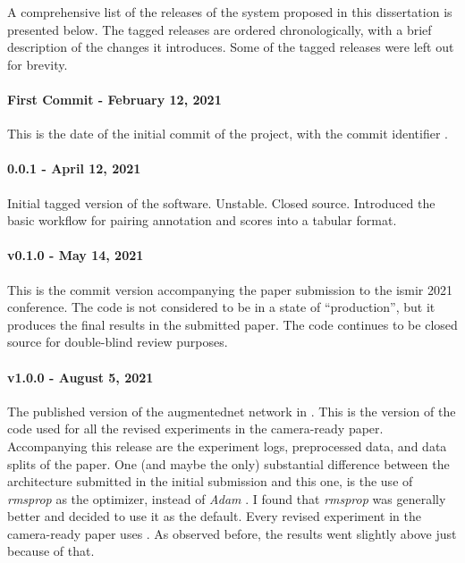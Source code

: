 
A comprehensive list of the releases of the system proposed
in this dissertation is presented below. The tagged releases
are ordered chronologically, with a brief description of the
changes it introduces. Some of the tagged releases were left
out for brevity.

\paragraph{First Commit - February 12, 2021}
This is the date of the initial commit of the project, with
the commit identifier .

\paragraph{0.0.1 - April 12, 2021}
Initial tagged version of the software. Unstable. Closed
source. Introduced the basic workflow for pairing annotation
and scores into a tabular format.

\paragraph{v0.1.0 - May 14, 2021}
This is the commit version accompanying the paper submission
to the \gls{ismir} 2021 conference. The code is not
considered to be in a state of ``production'', but it
produces the final results in the submitted paper. The code
continues to be closed source for double-blind review
purposes.

\paragraph{v1.0.0 - August 5, 2021}
The published version of the \gls{augmentednet} network in
\textcite{napoleslopez2021augmentednet}. This is the version
of the code used for all the revised experiments in the
camera-ready paper. Accompanying this release are the
experiment logs, preprocessed data, and data splits of the
paper. One (and maybe the only) substantial difference
between the architecture submitted in the initial submission
and this one, is the use of \emph{rmsprop} as the optimizer,
instead of \emph{Adam} \parencite{kingma2014adam}. I found
that \emph{rmsprop} was generally better and decided to use
it as the default. Every revised experiment in the
camera-ready paper uses . As observed before,
the results went slightly above just because of that.

